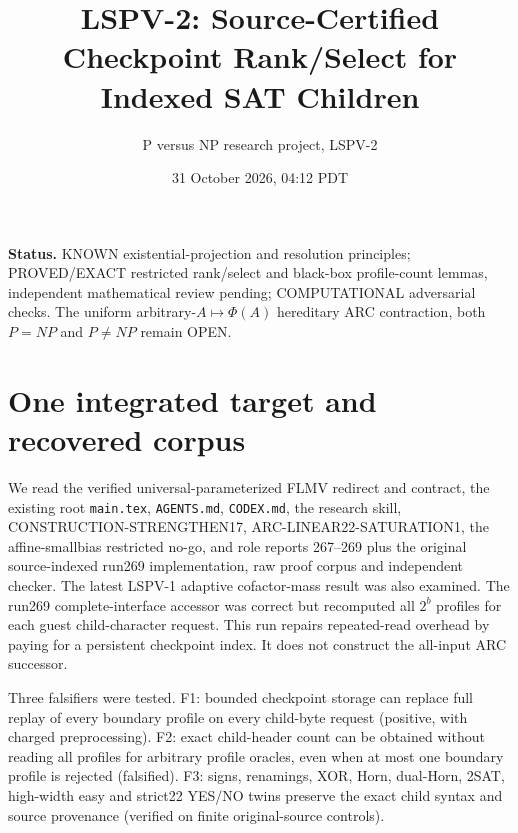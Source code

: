\documentclass[11pt]{article}
\title{LSPV-2: Source-Certified Checkpoint Rank/Select for Indexed SAT Children}
\author{P versus NP research project, LSPV-2}
\date{31 October 2026, 04:12 PDT}
\begin{document}
\maketitle
\noindent\textbf{Status.} KNOWN existential-projection and resolution principles;
PROVED/EXACT restricted rank/select and black-box profile-count lemmas,
independent mathematical review pending; COMPUTATIONAL adversarial checks.
The uniform arbitrary-$A\mapsto\Phi(A)$ hereditary ARC contraction, both
$P=NP$ and $P\ne NP$ remain OPEN.

\section{One integrated target and recovered corpus}
We read the verified universal-parameterized FLMV redirect and contract,
the existing root \texttt{main.tex}, \texttt{AGENTS.md}, \texttt{CODEX.md},
the research skill, CONSTRUCTION-STRENGTHEN17, ARC-LINEAR22-SATURATION1,
the affine-smallbias restricted no-go, and role reports 267--269 plus
the original source-indexed run269 implementation, raw proof corpus and
independent checker. The latest LSPV-1 adaptive cofactor-mass result was
also examined. The run269 complete-interface accessor was correct but
recomputed all $2^b$ profiles for each guest child-character request.
This run repairs repeated-read overhead by paying for a persistent
checkpoint index. It does not construct the all-input ARC successor.

Three falsifiers were tested. F1: bounded checkpoint storage can
replace full replay of every boundary profile on every child-byte
request (positive, with charged preprocessing). F2: exact child-header
count can be obtained without reading all profiles for arbitrary
profile oracles, even when at most one boundary profile is rejected
(falsified). F3: signs, renamings, XOR, Horn, dual-Horn, 2SAT, high-width
easy and strict22 YES/NO twins preserve the exact child syntax and
source provenance (verified on finite original-source controls).
\end{document}

